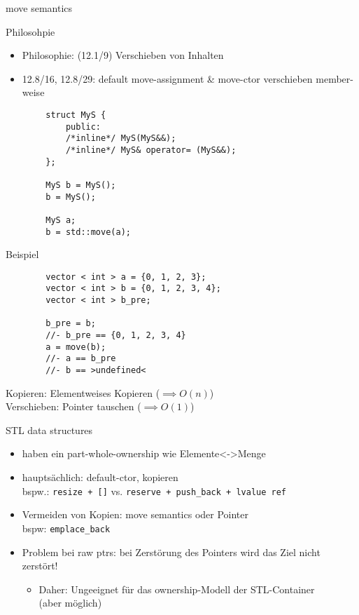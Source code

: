 \begin{frame}[fragile]{move semantics}
	\begin{block}{Philosohpie}
		\begin{itemize}
			\item Philosophie: (12.1/9) Verschieben von Inhalten
			\item 12.8/16, 12.8/29: default move-assignment \& move-ctor verschieben member-weise
		\end{itemize}
	\end{block}
	
	\pause
	
	\begin{lstlisting}
		struct MyS {
		    public:
		    /*inline*/ MyS(MyS&&);
		    /*inline*/ MyS& operator= (MyS&&);
		};
		
		MyS b = MyS();
		b = MyS();
		
		MyS a;
		b = std::move(a);
	\end{lstlisting}
\end{frame}

\begin{frame}[fragile]{Beispiel}
	\begin{lstlisting}
		vector < int > a = {0, 1, 2, 3};
		vector < int > b = {0, 1, 2, 3, 4};
		vector < int > b_pre;
		
		b_pre = b;
		//- b_pre == {0, 1, 2, 3, 4}
		a = move(b);
		//- a == b_pre
		//- b == >undefined<
	\end{lstlisting}
	
	\pause
	
	Kopieren: Elementweises Kopieren ($\implies O(n)$) \\
	Verschieben: Pointer tauschen ($\implies O(1)$)
\end{frame}

\begin{frame}{STL data structures}
	\begin{itemize}
		\item haben ein part-whole-ownership wie Elemente\textless-\textgreater Menge
		\item hauptsächlich: default-ctor, kopieren \\
		      bspw.: \texttt{resize + []} vs. \texttt{reserve + push\_back + lvalue ref}
		\item Vermeiden von Kopien: move semantics oder Pointer \\
		      bspw: \texttt{emplace\_back}
		\item Problem bei raw ptrs: bei Zerstörung des Pointers wird das Ziel nicht zerstört!
		\begin{itemize}
			\item Daher: Ungeeignet für das ownership-Modell der STL-Container\\
			      (aber möglich)
		\end{itemize}		      
	\end{itemize}
\end{frame}


